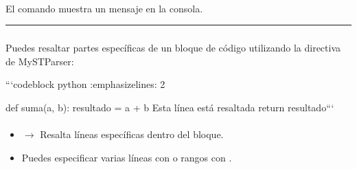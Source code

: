 \documentclass[a4paper,10pt,spanish]{sphinxmanual}
\begin{document}
\sphinxAtStartPar
{}\\
El comando  muestra un mensaje en la consola.


\bigskip\hrule\bigskip



\subsubsection{}
\label{\detokenize{configuracion_inicial/013.guia_de_myst_parser:resaltar-fragmentos-de-codigo-highlighting}}
\sphinxAtStartPar
Puedes resaltar partes específicas de un bloque de código utilizando la directiva  de MyST\sphinxhyphen{}Parser:

\begin{sphinxVerbatim}[commandchars=\\\{\}]
	```\PYGZob{}code\PYGZhy{}block\PYGZcb{} python
	:emphasize\PYGZhy{}lines: 2

	def suma(a, b):
	 resultado = a + b  \PYGZsh{} Esta línea está resaltada
	 return resultado```
\end{sphinxVerbatim}

\sphinxAtStartPar
{}

%
\begin{sphinxVerbatim}[commandchars=\\\{\}]
    
     
   
\end{sphinxVerbatim}
\sphinxresetverbatimhllines


\paragraph{}
\label{\detokenize{configuracion_inicial/013.guia_de_myst_parser:id5}}\begin{itemize}
\item {} 
\sphinxAtStartPar
{} \(\rightarrow\) Resalta líneas específicas dentro del bloque.

\item {} 
\sphinxAtStartPar
Puedes especificar varias líneas con  o rangos con .

\end{itemize}
\end{document}
